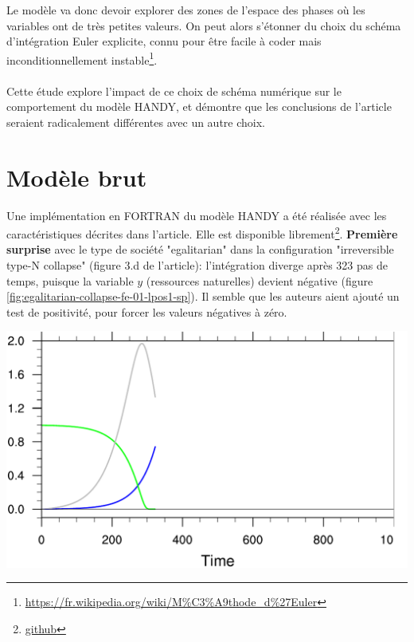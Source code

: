 \documentclass[12pt]{scrartcl}
\begin{document}
Le modèle va donc devoir explorer des zones de l'espace des phases où les variables ont de très petites valeurs. On peut alors s'étonner du choix du schéma d'intégration Euler explicite, connu pour être facile à coder mais inconditionnellement instable\footnote{\url{https://fr.wikipedia.org/wiki/M\%C3\%A9thode_d\%27Euler}}.\\
$  $\\
Cette étude explore l'impact de ce choix de schéma numérique sur le comportement du modèle HANDY, et démontre que les conclusions de l'article seraient radicalement différentes avec un autre choix.

\section{Modèle brut}
Une implémentation en FORTRAN du modèle HANDY a été réalisée avec les caractéristiques décrites dans l'article. Elle est disponible librement\footnote{\url{github}}. \textbf{Première surprise} avec le type de société "egalitarian" dans la configuration "irreversible type-N collapse" (figure 3.d de l'article): l'intégration diverge après 323 pas de temps, puisque la variable $y$ (ressources naturelles) devient négative (figure \ref{fig:egalitarian-collapse-fe-01-lpos1-sp}). Il semble que les auteurs aient ajouté un test de positivité, pour forcer les valeurs négatives à zéro.

\begin{center}
\includegraphics[width=0.7\linewidth]{../ncl/egalitarian-collapse-fe-01-lpos1-sp.pdf}
\end{center}
\end{document}
